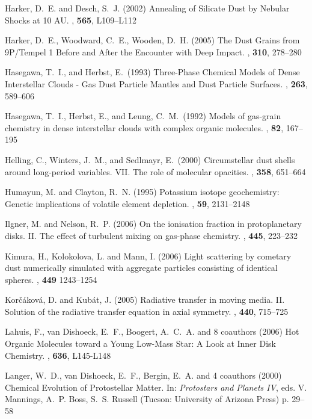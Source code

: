 \begin{literature}
\item
Harker, D.~E. and Desch, S.~J. (2002) Annealing of Silicate Dust by Nebular
Shocks at 10 AU. \apjl, \textbf{565}, L109--L112

\item
Harker, D.~E., Woodward, C.~E., Wooden, D.~H. (2005) The Dust Grains from
9P/Tempel 1 Before and After the Encounter with Deep Impact. \sci, \textbf{310},
278--280

\item
Hasegawa, T.~I., and Herbst, E.\ (1993) Three-Phase Chemical Models of Dense
Interstellar Clouds - Gas Dust Particle Mantles and Dust Particle Surfaces.
\mnras, \textbf{263}, 589--606

\item
Hasegawa, T.~I., Herbst, E., and Leung, C.~M.\ (1992) Models of gas-grain
chemistry in dense interstellar clouds with complex organic molecules.
\apjs, \textbf{82}, 167--195

\item
Helling, C., Winters, J.~M., and Sedlmayr, E.\ (2000) Circumstellar dust shells
around long-period variables. VII. The role of molecular opacities.
\aap, \textbf{358}, 651--664

\item
Humayun, M. and Clayton, R.~N. (1995) Potassium isotope geochemistry: Genetic
implications of volatile element depletion. \gca, \textbf{59}, 2131--2148

\item
Ilgner, M. and Nelson, R.~P. (2006) On the ionisation fraction in protoplanetary
disks. II. The effect of turbulent mixing on gas-phase chemistry. \aap,
\textbf{445}, 223--232

\item
Kimura, H., Kolokolova, L. and Mann, I. (2006) Light scattering by cometary dust
numerically simulated with aggregate particles consisting of identical spheres.
\aap, \textbf{449} 1243--1254

\item
Kor{\v c}{\'a}kov{\'a}, D. and Kub{\'a}t, J. (2005) Radiative transfer in
moving media. II. Solution of the radiative transfer equation in axial symmetry.
\aap, \textbf{440}, 715--725

\item
Lahuis, F., van Dishoeck, E.~F., Boogert, A.~C.~A. and 8 coauthors (2006) Hot
Organic Molecules toward a Young Low-Mass Star: A Look at Inner Disk Chemistry.
\apjl, \textbf{636}, L145-L148

\item
Langer, W.~D., van Dishoeck, E.~F., Bergin, E.~A. and 4 coauthors (2000)
Chemical Evolution of Protostellar Matter. In: 
\textit{Protostars and Planets IV}, eds. V. Mannings, A.~P. Boss, S.~S. Russell (Tucson: University of Arizona
Press) p. 29--58


\end{literature}
